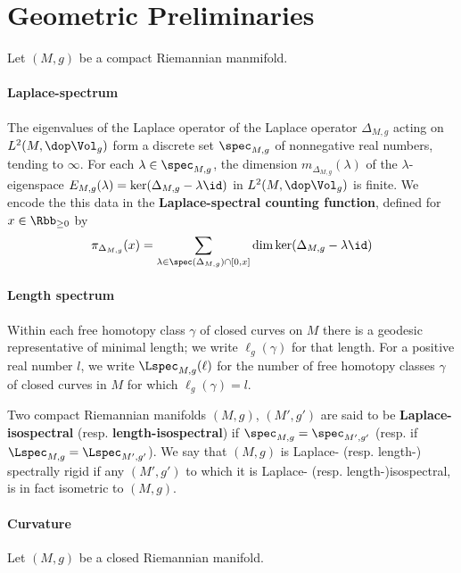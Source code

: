 \section{Geometric Preliminaries}
Let $(M,g)$ be a compact Riemannian manmifold.
\paragraph{Laplace-spectrum}
The eigenvalues of the Laplace operator of the Laplace operator $\Delta_{M,g}$ acting on $L^2(M,\dop \Vol_g)$ form a discrete set $\spec_{M,g}$ of nonnegative real numbers, tending to $\infty$. For each $\lambda \in \spec_{M,g}$, the dimension $m_{\Delta_{M,g}}(\lambda)$ of the $\lambda$-eigenspace $E_{M,g}(\lambda)=\ker (\Delta_{M,g}- \lambda \id)$ in $L^2(M, \dop \Vol_g)$ is finite. We encode the this data in the \textbf{Laplace-spectral counting function}, defined for $x\in \Rbb_{\geq 0}$ by
\begin{align}
  \pi_{\Delta_{M,g}}(x) = \sum_{\lambda \in \spec(\Delta_{M,g}) \cap [0,x]} \dim \ker (\Delta_{M,g} - \lambda \id )
\end{align}


\paragraph{Length spectrum}
Within each free homotopy class $\gamma$ of closed curves on $M$ there is a geodesic representative of minimal length; we write $\ell_g(\gamma)$ for that length. For a positive real number $l$, we write $\Lspec_{M,g}(\ell)$ for the number of free homotopy classes $\gamma$ of closed curves in $M$ for which $\ell_g(\gamma) = l$.


Two compact Riemannian manifolds $(M,g)$, $(M',g')$  are said to be \textbf{Laplace-isospectral} (resp. \textbf{length-isospectral})  if $\spec_{M,g} = \spec_{M',g'}$ (resp.  if $\Lspec_{M,g}=\Lspec_{M',g'}$). We say that $(M,g)$ is Laplace- (resp. length-) spectrally rigid if any $(M',g')$ to which it is Laplace- (resp. length-)isospectral, is in fact isometric to $(M,g)$.

\paragraph{Curvature}
Let $(M,g)$ be a closed Riemannian manifold.

